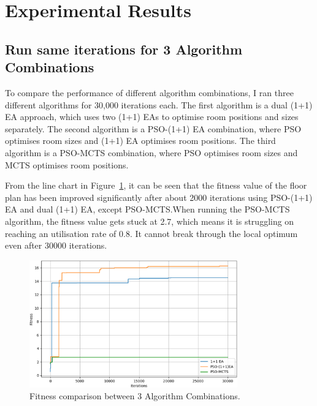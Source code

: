 \documentclass[]{article}
\begin{document}
\section{Experimental Results}
\subsection{Run same iterations for 3 Algorithm Combinations}
To compare the performance of different algorithm combinations, I ran three different algorithms for 30,000 iterations each. The first algorithm is a dual (1+1) EA approach, which uses two (1+1) EAs to optimise room positions and sizes separately. The second algorithm is a PSO-(1+1) EA combination, where PSO optimises room sizes and (1+1) EA optimises room positions. The third algorithm is a PSO-MCTS combination, where PSO optimises room sizes and MCTS optimises room positions.

From the line chart in Figure~\ref{fig:compare-3algorithm}, it can be seen that the fitness value of the floor plan has been improved significantly after about 2000 iterations using PSO-(1+1) EA and dual (1+1) EA, except PSO-MCTS.\@ When running the PSO-MCTS algorithm, the fitness value gets stuck at 2.7, which means it is struggling on reaching an utilisation rate of 0.8. It cannot break through the local optimum even after 30000 iterations.
\begin{figure}[h]
    \centering
    \includegraphics[width=0.8\textwidth]{images/compare-3algorithm.png}
    \caption{Fitness comparison between 3 Algorithm Combinations.}
    \label{fig:compare-3algorithm}
\end{figure}
\end{document}
